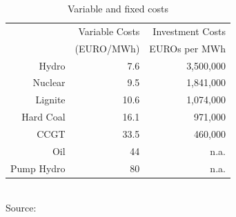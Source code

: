 \begin{table}[htb]
\centering
\caption{Variable and fixed costs}
\vspace{0.3cm}
\begin{tabular}{rrr}
\hline
           & Variable Costs & Investment Costs \\

           & (EURO/MWh) & EUROs per MWh \\
\hline
     Hydro &        7.6 &    3,500,000 \\

   Nuclear &        9.5 &    1,841,000 \\

   Lignite &       10.6 &    1,074,000 \\

 Hard Coal &       16.1 &     971,000 \\

CCGT &       33.5 &     460,000 \\

Oil & 44            &   n.a.\\

Pump Hydro &         80 &       n.a.\\
\hline
\end{tabular}
\label{tab:costs}
\\
\vspace{0.3cm}
\scriptsize Source: \cite{Auer2006}
\end{table}



